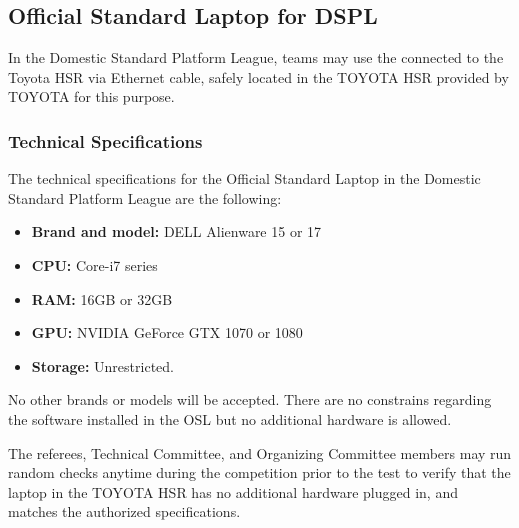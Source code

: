 \subsection{Official Standard Laptop for DSPL}
\label{rule:osl_dspl}
% 
% 


% 
% 
In the Domestic Standard Platform League, teams may use the  connected to the Toyota HSR via Ethernet cable, safely located in the TOYOTA HSR  provided by TOYOTA for this purpose.

\subsubsection{Technical Specifications}
The technical specifications for the Official Standard Laptop in the Domestic Standard Platform League are the following:


 \begin{itemize}
  \item \textbf{Brand and model:} DELL Alienware 15 or 17
  \item \textbf{CPU:} Core-i7 series
  \item \textbf{RAM:} 16GB or 32GB
  \item \textbf{GPU:} NVIDIA GeForce GTX 1070 or 1080
  \item \textbf{Storage:} Unrestricted.
\end{itemize}

No other brands or models will be accepted. There are no constrains regarding the software installed in the OSL but no additional hardware is allowed.

The referees, Technical Committee, and Organizing Committee members may run random checks anytime during the competition prior to the test to verify that the laptop in the TOYOTA HSR  has no additional hardware plugged in, and matches the authorized specifications.

